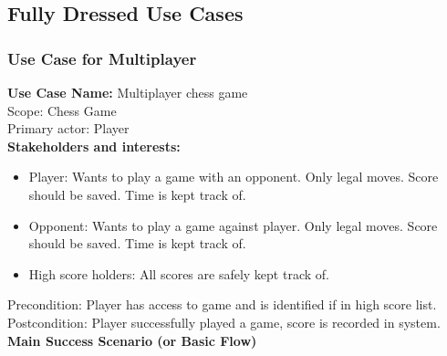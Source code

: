\documentclass{article}
\begin{document}
\clearpage
\begin{flushleft}
		
\subsection{Fully Dressed Use Cases}
	\subsubsection{Use Case for Multiplayer}
	\textbf {Use Case Name:} Multiplayer chess game\\
	\vspace{1mm}
	Scope: Chess Game\\
	\vspace{1mm}
	Primary actor: Player\\
	\vspace{1mm}
	\textbf{Stakeholders and interests:}\\
	\begin{itemize}
	
		\item Player: Wants to play a game with an opponent. Only legal moves. Score should be saved. Time is kept track of.\\
	
		\item Opponent: Wants to play a game against player. Only legal moves. Score should be saved. Time is kept track of.\\
	
		\item High score holders: All scores are safely kept track of.
		
	\end{itemize}
	
	Precondition: Player has access to game and is identified if in high score list.\\
	\vspace{1mm}
	Postcondition: Player successfully played a game, score is recorded in system.\\
	\vspace{2mm}
	\textbf{Main Success Scenario (or Basic Flow)}\\
	
	\begin{enumerate}
	

\end{enumerate}
\end{flushleft}
\end{document}
